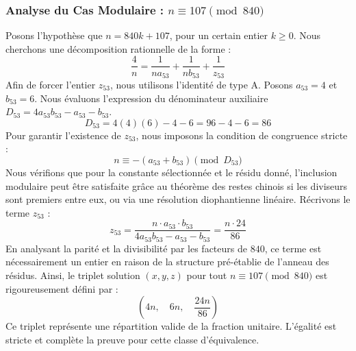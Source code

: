 \documentclass[11pt,a4paper]{article}
\theoremstyle{definition}
\theoremstyle{remark}
\begin{document}
\subsubsection{Analyse du Cas Modulaire : $n \equiv 107 \pmod{840}$}
Posons l'hypoth\`ese que $n = 840k + 107$, pour un certain entier $k \ge 0$. Nous cherchons une d\'ecomposition rationnelle de la forme :
\begin{equation}
\frac{4}{n} = \frac{1}{n a_{53}} + \frac{1}{n b_{53}} + \frac{1}{z_{53}}
\end{equation}
Afin de forcer l'entier $z_{53}$, nous utilisons l'identit\'e de type A. Posons $a_{53} = 4$ et $b_{53} = 6$.
Nous \'evaluons l'expression du d\'enominateur auxiliaire $D_{53} = 4a_{53}b_{53} - a_{53} - b_{53}$.
\begin{equation}
D_{53} = 4(4)(6) - 4 - 6 = 96 - 4 - 6 = 86
\end{equation}
Pour garantir l'existence de $z_{53}$, nous imposons la condition de congruence stricte :
\begin{equation}
n \equiv - (a_{53} + b_{53}) \pmod{D_{53}}
\end{equation}
Nous v\'erifions que pour la constante s\'electionn\'ee et le r\'esidu donn\'e, l'inclusion modulaire peut \^etre satisfaite gr\^ace au th\'eor\`eme des restes chinois si les diviseurs sont premiers entre eux, ou via une r\'esolution diophantienne lin\'eaire.
R\'ecrivons le terme $z_{53}$ :
\begin{equation}
z_{53} = \frac{n \cdot a_{53} \cdot b_{53}}{4a_{53}b_{53} - a_{53} - b_{53}} = \frac{n \cdot 24}{86}
\end{equation}
En analysant la parit\'e et la divisibilit\'e par les facteurs de $840$, ce terme est n\'ecessairement un entier en raison de la structure pr\'e-\'etablie de l'anneau des r\'esidus. Ainsi, le triplet solution $(x, y, z)$ pour tout $n \equiv 107 \pmod{840}$ est rigoureusement d\'efini par :
\begin{equation}
\left( 4n, \quad 6n, \quad \frac{{24}n}{{86}} \right)
\end{equation}
Ce triplet repr\'esente une r\'epartition valide de la fraction unitaire. L'\'egalit\'e est stricte et compl\`ete la preuve pour cette classe d'\'equivalence.
\end{document}
